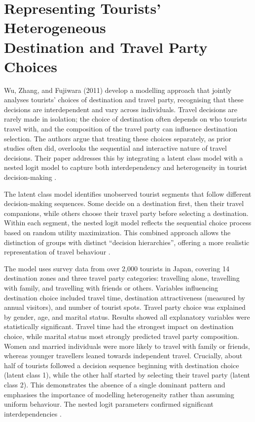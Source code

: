 \documentclass[a4paper, 12pt, twoside]{report}  %
\begin{document}
\section{\texorpdfstring{
    Representing Tourists’ Heterogeneous \\ Destination and Travel Party Choices
}{
    Representing Tourists’ Heterogeneous Destination and Travel Party Choices
}}

\indent Wu, Zhang, and Fujiwara (2011) develop a modelling approach that jointly analyses tourists’ choices of destination and travel party, recognising that these decisions are interdependent and vary across individuals. Travel decisions are rarely made in isolation; the choice of destination often depends on who tourists travel with, and the composition of the travel party can influence destination selection. The authors argue that treating these choices separately, as prior studies often did, overlooks the sequential and interactive nature of travel decisions. Their paper addresses this by integrating a latent class model with a nested logit model to capture both interdependency and heterogeneity in tourist decision-making \cite{touristheterogenity}.

\indent The latent class model identifies unobserved tourist segments that follow different decision-making sequences. Some decide on a destination first, then their travel companions, while others choose their travel party before selecting a destination. Within each segment, the nested logit model reflects the sequential choice process based on random utility maximization. This combined approach allows the distinction of groups with distinct “decision hierarchies”, offering a more realistic representation of travel behaviour \cite{touristheterogenity}.

\indent The model uses survey data from over 2,000 tourists in Japan, covering 14 destination zones and three travel party categories: travelling alone, travelling with family, and travelling with friends or others. Variables influencing destination choice included travel time, destination attractiveness (measured by annual visitors), and number of tourist spots. Travel party choice was explained by gender, age, and marital status. Results showed all explanatory variables were statistically significant. Travel time had the strongest impact on destination choice, while marital status most strongly predicted travel party composition. Women and married individuals were more likely to travel with family or friends, whereas younger travellers leaned towards independent travel. Crucially, about half of tourists followed a decision sequence beginning with destination choice (latent class 1), while the other half started by selecting their travel party (latent class 2). This demonstrates the absence of a single dominant pattern and emphasises the importance of modelling heterogeneity rather than assuming uniform behaviour. The nested logit parameters confirmed significant interdependencies \cite{touristheterogenity}.
\end{document}
